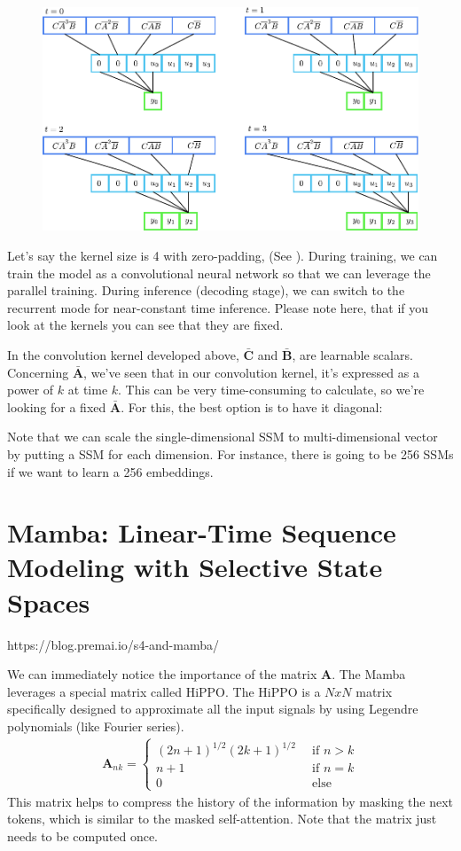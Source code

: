 \begin{figure}[t]
	\centering
	\includegraphics[scale=0.95]{./images/state_space/mamba_conv.pdf}
	\caption{}
	\label{fig:mamba_conv}
\end{figure}

Let's say the kernel size is 4 with zero-padding,  (See ). During training, we can train the model as a convolutional neural network so that we can leverage the parallel training. During inference (\ie decoding stage), we can switch to the recurrent mode for near-constant time inference. Please note here, that if you look at the kernels you can see that they are fixed. 


In the convolution kernel developed above, $\mathbf{\bar{C}}$ and $\mathbf{\bar{B}}$, are learnable scalars.
Concerning $\mathbf{\bar{A}}$, we've seen that in our convolution kernel, it's expressed as a power of $k$ at time $k$. This can be very time-consuming to calculate, so we're looking for a fixed $\mathbf{\bar{A}}$. For this, the best option is to have it diagonal:


Note that we can scale the single-dimensional SSM to multi-dimensional vector by putting a SSM for each dimension. For instance, there is going to be 256 SSMs if we want to learn a 256 embeddings.  


\section{Mamba: Linear-Time Sequence Modeling with Selective State Spaces}
\label{sec:ssm_mamba}
https://blog.premai.io/s4-and-mamba/

We can immediately notice the importance of the matrix $\mathbf{A}$. The Mamba leverages a special matrix called HiPPO. The HiPPO is a $N x N$ matrix specifically designed to approximate all the input signals by using Legendre polynomials (like Fourier series). 
\begin{align*}
	\mathbf{A}_{nk} = 
\begin{cases}
	(2n+1)^{1/2}(2k+1)^{1/2}\, &\textrm{ if } n>k\\
	n+1\, &\textrm{ if } n=k\\
	0\, &\textrm{ else }
\end{cases}
\end{align*}
This matrix helps to compress the history of the information by masking the next tokens, which is similar to the masked self-attention. Note that the matrix just needs to be computed once. 


